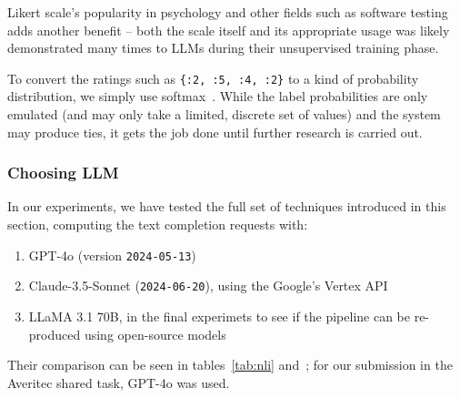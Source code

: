 Likert scale's popularity in psychology and other fields such as software testing~\cite{likertstudy} adds another benefit -- both the scale itself and its appropriate usage was likely demonstrated many times to LLMs during their unsupervised training phase.

To convert the ratings such as \texttt{\{:2, :5, :4, :2\}} to a kind of probability distribution, we simply use softmax~\cite{NIPS1989_0336dcba}.
While the label probabilities are only emulated (and may only take a limited, discrete set of values) and the system may produce ties, it gets the job done until further research is carried out.

\subsubsection{Choosing LLM}
In our experiments, we have tested the full set of techniques introduced in this section, computing the text completion requests with:
\begin{enumerate}
    \item GPT-4o (version \texttt{2024-05-13})
    \item Claude-3.5-Sonnet (\texttt{2024-06-20}), using the Google's Vertex API
    \item LLaMA 3.1 70B, in the final experimets to see if the pipeline can be re-produced using open-source models
\end{enumerate} 

Their comparison can be seen in tables~\ref{tab:nli} and~; for our submission in the Averitec shared task, GPT-4o was used.